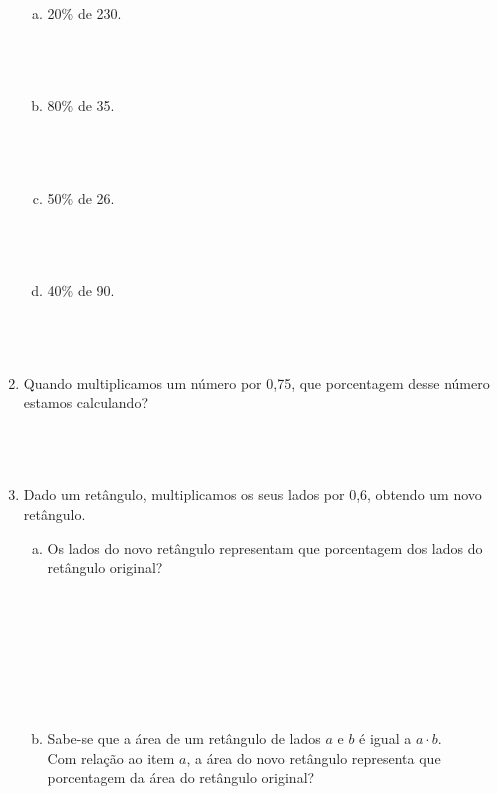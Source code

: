 \documentclass[a4paper,14pt]{article}
\begin{document}
\begin{multicols}{2}
\begin{enumerate}
			\begin{enumerate}[a)]
				\item 20\% de 230. \\\\\\\\
				\item 80\% de 35. \\\\\\\\
				\item 50\% de 26. \\\\\\\\
				\item 40\% de 90. \\\\\\\\
			\end{enumerate}
			\item Quando multiplicamos um número por 0,75, que porcentagem desse número estamos calculando? \\\\\\\\
			\item Dado um retângulo, multiplicamos os seus lados por 0,6, obtendo um novo retângulo.
			\begin{enumerate}[a)]
				\item Os lados do novo retângulo representam que porcentagem dos lados do retângulo original? \\\\\\\\\\\\\\\\
				\item Sabe-se que a área de um retângulo de lados $a$ e $b$ é igual a $a \cdot b$. \\
				Com relação ao item $a$, a área do novo retângulo representa que porcentagem da área do retângulo original? \\\\\\\\\\\\\\\\\\

\end{enumerate}
\end{enumerate}
\end{multicols}
\end{document}
